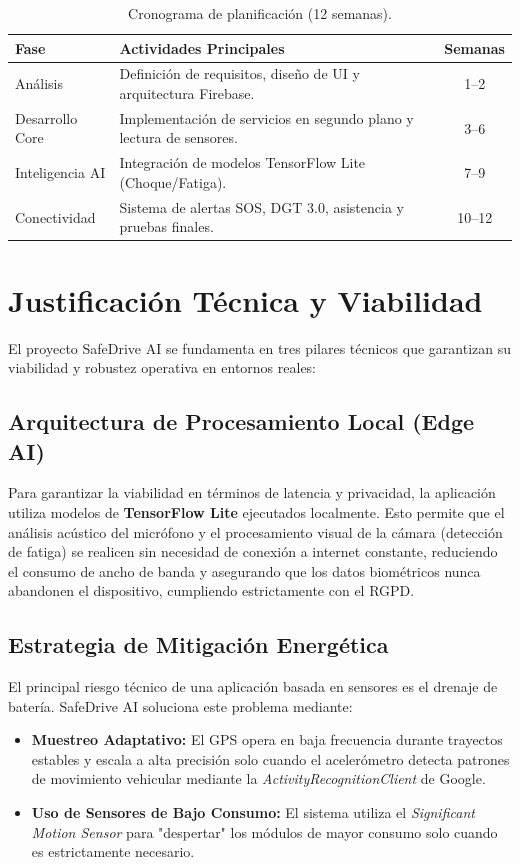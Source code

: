 \documentclass[11pt, a4paper]{article}
\begin{document}
    \begin{table}[H]
        \centering
        \caption{Cronograma de planificación (12 semanas).}
        \small
        \begin{tabular}{@{}lp{10cm}c@{}}
            \toprule
            \textbf{Fase} & \textbf{Actividades Principales} & \textbf{Semanas} \\ \midrule
            Análisis & Definición de requisitos, diseño de UI y arquitectura Firebase. & 1--2 \\
            Desarrollo Core & Implementación de servicios en segundo plano y lectura de sensores. & 3--6 \\
            Inteligencia AI & Integración de modelos TensorFlow Lite (Choque/Fatiga). & 7--9 \\
            Conectividad & Sistema de alertas SOS, DGT 3.0, asistencia y pruebas finales. & 10--12 \\ \bottomrule
        \end{tabular}
    \end{table}

    \section{Justificación Técnica y Viabilidad}
    El proyecto SafeDrive AI se fundamenta en tres pilares técnicos que garantizan su viabilidad y robustez operativa en entornos reales:

    \subsection{Arquitectura de Procesamiento Local (Edge AI)}
    Para garantizar la viabilidad en términos de latencia y privacidad, la aplicación utiliza modelos de \textbf{TensorFlow Lite} ejecutados localmente. Esto permite que el análisis acústico del micrófono y el procesamiento visual de la cámara (detección de fatiga) se realicen sin necesidad de conexión a internet constante, reduciendo el consumo de ancho de banda y asegurando que los datos biométricos nunca abandonen el dispositivo, cumpliendo estrictamente con el RGPD.

    \subsection{Estrategia de Mitigación Energética}
    El principal riesgo técnico de una aplicación basada en sensores es el drenaje de batería. SafeDrive AI soluciona este problema mediante:
    \begin{itemize}
        \item \textbf{Muestreo Adaptativo:} El GPS opera en baja frecuencia durante trayectos estables y escala a alta precisión solo cuando el acelerómetro detecta patrones de movimiento vehicular mediante la \textit{ActivityRecognitionClient} de Google.
        \item \textbf{Uso de Sensores de Bajo Consumo:} El sistema utiliza el \textit{Significant Motion Sensor} para "despertar" los módulos de mayor consumo solo cuando es estrictamente necesario.
    \end{itemize}
\end{document}
